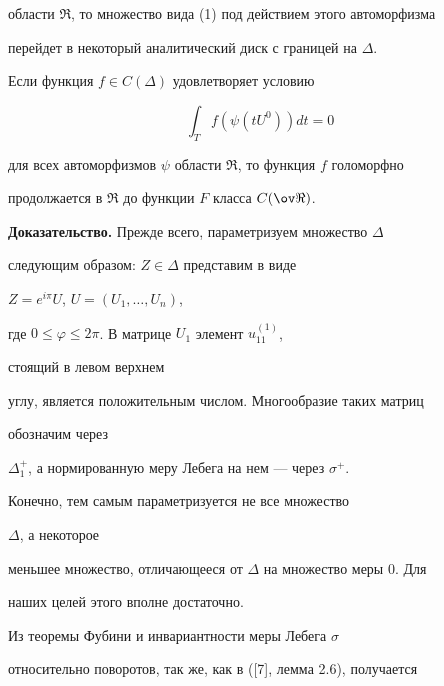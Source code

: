 области $\Re$, то множество вида (1) под действием этого автоморфизма 


перейдет в некоторый аналитический диск с границей на $\Delta$. 


 


\begin{thm} 


Если функция $f\in C(\Delta)$ удовлетворяет условию 


\begin{equation} 


\int_T f(\psi(t U^0))dt=0 


\end{equation} 


для всех автоморфизмов $\psi$ области $\Re$, то функция $f$ голоморфно 


продолжается в $\Re$ до функции $F$ класса $C(\ov\Re)$. 


\end{thm} 


 


{\bf Доказательство.} Прежде всего, параметризуем множество $\Delta$ 


следующим образом: $Z\in\Delta$ представим в виде 


$Z=e^{i\pi}U$, $U=(U_1,\dotsc,U_n)$, 


где $0\le\varphi\le2\pi$. В матрице $U_1$ элемент $u^{(1)}_{11}$, 


стоящий в левом верхнем 


углу, является положительным числом. Многообразие таких матриц 


обозначим через 


$\Delta^+_1$, а нормированную меру Лебега на нем --- через $\sigma^+$. 


Конечно, тем самым параметризуется не все множество 


$\Delta$, а некоторое 


меньшее множество, отличающееся от $\Delta$ на множество меры 0. Для 


наших целей этого вполне достаточно. 


 


Из теоремы Фубини и инвариантности меры Лебега $\sigma$ 


относительно поворотов, так же, как в ([7], лемма 2.6), получается 


 


